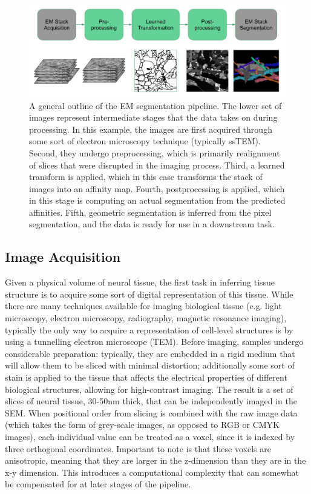 \begin{figure}
\centering
\includegraphics[width=\textwidth]{img/seg_pipeline.png}
\caption[A general outline of the EM segmentation pipeline]{A general outline of the EM segmentation pipeline. The lower set of images represent intermediate stages that the data takes on during processing. In this example, the images are first acquired through some sort of electron microscopy technique (typically ssTEM). Second, they undergo preprocessing, which is primarily realignment of slices that were disrupted in the imaging process. Third, a learned transform is applied, which in this case transforms the stack of images into an affinity map. Fourth, postprocessing is applied, which in this stage is computing an actual segmentation from the predicted affinities. Fifth, geometric segmentation is inferred from the pixel segmentation, and the data is ready for use in a downstream task. }
\label{fig:segmentation_pipeline}
\end{figure}

\subsection{Image Acquisition}
Given a physical volume of neural tissue, the first task in inferring tissue structure is to acquire some sort of digital representation of this tissue. While there are many techniques available for imaging biological tissue (e.g. light microscopy, electron microscopy, radiography, magnetic resonance imaging), typically the only way to acquire a representation of cell-level structures is by using a tunnelling electron microscope (TEM).  Before imaging, samples undergo considerable preparation: typically, they are embedded in a rigid medium that will allow them to be sliced with minimal distortion; additionally some sort of stain is applied to the tissue that affects the electrical properties of different biological structures, allowing for high-contrast imaging. The result is a set of slices of neural tissue, 30-50nm thick, that can be independently imaged in the SEM. When positional order from slicing is combined with the raw image data (which takes the form of grey-scale images, as opposed to RGB or CMYK images), each individual value can be treated as a voxel, since it is indexed by three orthogonal coordinates. Important to note is that these voxels are anisotropic, meaning that they are larger in the z-dimension than they are in the x-y dimension. This introduces a computational complexity that can somewhat be compensated for at later stages of the pipeline.


